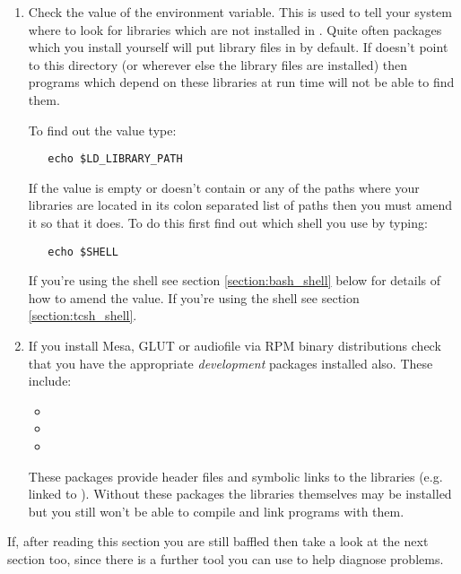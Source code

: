 \begin{enumerate}
\item
Check the value of the  environment variable. This
is used to tell your system where to look for libraries which are
not installed in . Quite often packages which you install
yourself will put library files in  by default. If 
 doesn't point to this directory (or wherever else
the library files are installed) then programs which depend on these
libraries at run time will not be able to find them.
 
To find out the value type:

\begin{verbatim}
   echo $LD_LIBRARY_PATH
\end{verbatim}

If the value is empty or doesn't contain  or any of
the paths where your libraries are located in its colon separated list of paths
then you must amend it so that it does. To do this first find out which shell you
use by typing:

\begin{verbatim}
   echo $SHELL
\end{verbatim}

If you're using the  shell see section \ref{section:bash_shell}
below for details of how to amend the value. If you're using the 
shell see section \ref{section:tcsh_shell}.

\item
If you install Mesa, GLUT or audiofile via RPM binary distributions
check that you have the appropriate \emph{development} packages installed
also. These include:

\begin{itemize}
\item{}
\item{}
\item{}
\end{itemize}

These packages provide header files and symbolic links to the libraries
(e.g.  linked to ).
Without these packages the libraries themselves may be installed
but you still won't be able to compile and link programs with them.
\end{enumerate}

If, after reading this section you are still baffled then take a look
at the next section too, since there is a further tool you can use to
help diagnose problems.


